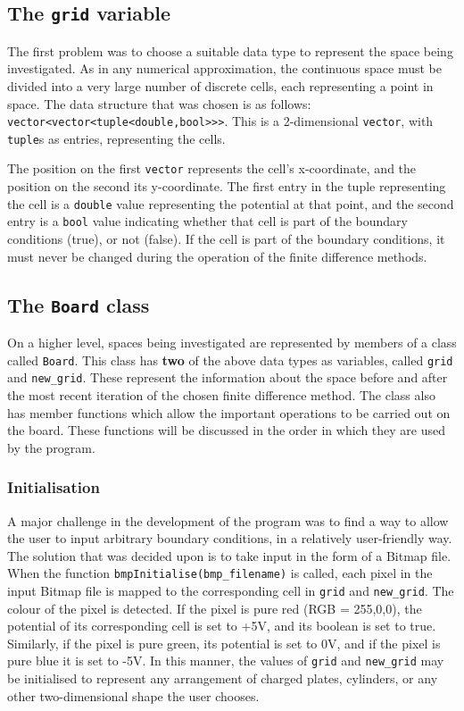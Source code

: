 \documentclass{article}
\begin{document}
\subsection{The \texttt{grid} variable}
The first problem was to choose a suitable data type to represent the space being investigated. As in any numerical approximation, the continuous space must be divided into a very large number of discrete cells, each representing a point in space. The data structure that was chosen is as follows: \texttt{vector<vector<tuple<double,bool>>>}. This is a 2-dimensional \texttt{vector}, with \texttt{tuple}s as entries, representing the cells.

The position on the first \texttt{vector} represents the cell's x-coordinate, and the position on the second its y-coordinate. The first entry in the tuple representing the cell is a \texttt{double} value representing the potential at that point, and the second entry is a \texttt{bool} value indicating whether that cell is part of the boundary conditions (true), or not (false). If the cell is part of the boundary conditions, it must never be changed during the operation of the finite difference methods.
\subsection{The \texttt{Board} class}
On a higher level, spaces being investigated are represented by members of a class called \texttt{Board}. This class has \textbf{two} of the above data types as variables, called \texttt{grid} and \texttt{new\_grid}. These represent the information about the space before and after the most recent iteration of the chosen finite difference method. The class also has member functions which allow the important operations to be carried out on the board. These functions will be discussed in the order in which they are used by the program.

\subsubsection{Initialisation}
A major challenge in the development of the program was to find a way to allow the user to input arbitrary boundary conditions, in a relatively user-friendly way. The solution that was decided upon is to take input in the form of a Bitmap file. When the function \texttt{bmpInitialise(bmp\_filename)} is called, each pixel in the input Bitmap file is mapped to the corresponding cell in \texttt{grid} and \texttt{new\_grid}. The colour of the pixel is detected. If the pixel is pure red (RGB = 255,0,0), the potential of its corresponding cell is set to +5V, and its boolean is set to true. Similarly, if the pixel is pure green, its potential is set to 0V, and if the pixel is pure blue it is set to -5V. In this manner, the values of \texttt{grid} and \texttt{new\_grid} may be initialised to represent any arrangement of charged plates, cylinders, or any other two-dimensional shape the user chooses.
\end{document}
